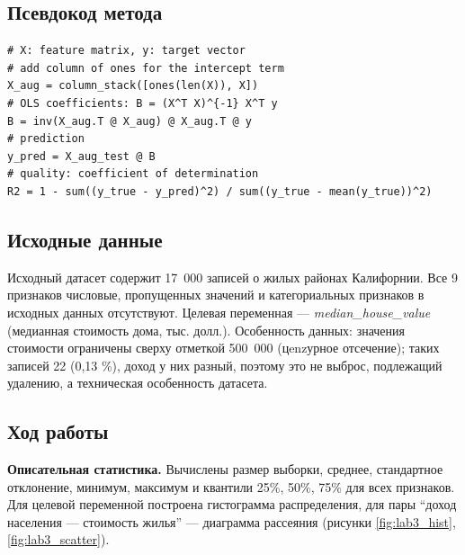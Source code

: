 \documentclass[12pt,a4paper]{article}
\begin{document}
\subsection{Псевдокод метода}
\begin{lstlisting}
# X: feature matrix, y: target vector
# add column of ones for the intercept term
X_aug = column_stack([ones(len(X)), X])
# OLS coefficients: B = (X^T X)^{-1} X^T y
B = inv(X_aug.T @ X_aug) @ X_aug.T @ y
# prediction
y_pred = X_aug_test @ B
# quality: coefficient of determination
R2 = 1 - sum((y_true - y_pred)^2) / sum((y_true - mean(y_true))^2)
\end{lstlisting}

\subsection{Исходные данные}
Исходный датасет содержит 17~000 записей о жилых районах Калифорнии. Все 9 признаков числовые, пропущенных значений и категориальных признаков в исходных данных отсутствуют. Целевая переменная --- \emph{median\_house\_value} (медианная стоимость дома, тыс. долл.). Особенность данных: значения стоимости ограничены сверху отметкой 500~000 (цenzурное отсечение); таких записей 22 (0,13 \%), доход у них разный, поэтому это не выброс, подлежащий удалению, а техническая особенность датасета.

\subsection{Ход работы}
\textbf{Описательная статистика.} Вычислены размер выборки, среднее, стандартное отклонение, минимум, максимум и квантили 25\%, 50\%, 75\% для всех признаков. Для целевой переменной построена гистограмма распределения, для пары ``доход населения --- стоимость жилья'' --- диаграмма рассеяния (рисунки \ref{fig:lab3_hist}, \ref{fig:lab3_scatter}).
\end{document}
